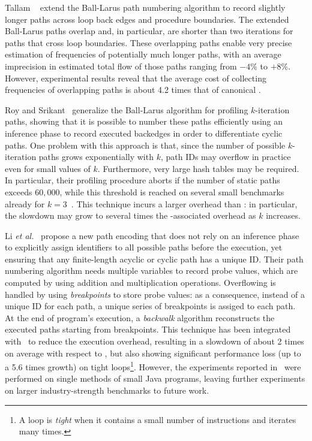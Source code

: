 Tallam \etal~\cite{Tallam04} extend the Ball-Larus path numbering algorithm to record slightly longer paths across loop back edges and procedure boundaries. The extended Ball-Larus paths overlap and, in particular, are shorter than two iterations for paths that cross loop boundaries. These overlapping paths enable very precise estimation of frequencies of potentially much longer paths, with an average imprecision in estimated total flow of those paths ranging from $-4\%$ to $+8\%$. However, experimental results reveal that the average cost of collecting frequencies of overlapping paths is about 4.2 times that of canonical \blpp.

Roy and Srikant~\cite{Roy09} generalize the Ball-Larus algorithm for profiling $k$-iteration paths, showing that it is possible to number these paths efficiently using an inference phase to record executed backedges in order to differentiate cyclic paths. One problem with this approach is that, since the number of possible $k$-iteration paths grows exponentially with $k$, path IDs may overflow in practice even for small values of $k$. Furthermore, very large hash tables may be required. In particular, their profiling procedure aborts if the number of static paths exceeds $60,000$, while this threshold is reached on several small benchmarks already for $k=3$~\cite{Li12}. This technique incurs a larger overhead than \blpp: in particular, the slowdown may grow to several times the \blpp-associated overhead as $k$ increases.

Li {\em et al.}~\cite{Li12} propose a new path encoding that does not rely on an inference phase to explicitly assign identifiers to all possible paths before the execution, yet ensuring that any finite-length acyclic or cyclic path has a unique ID. Their path numbering algorithm needs multiple variables to record probe values, which are computed by using addition and multiplication operations. Overflowing is handled by using {\em breakpoints} to store probe values: as a consequence, instead of a unique ID for each path, a unique series of breakpoints is assiged to each path. At the end of program's execution, a {\em backwalk} algorithm reconstructs the executed paths starting from breakpoints. This technique has been integrated with \blpp\ to reduce the execution overhead, resulting in a slowdown of about 2 times on average with respect to \blpp, but also showing significant performance loss (up to a 5.6 times growth) on tight loops\footnote{A loop is {\em tight} when it contains a small number of instructions and iterates many times.}. However, the experiments reported in~\cite{Li12} were performed on single methods of small Java programs, leaving further experiments on larger industry-strength benchmarks to future work.

